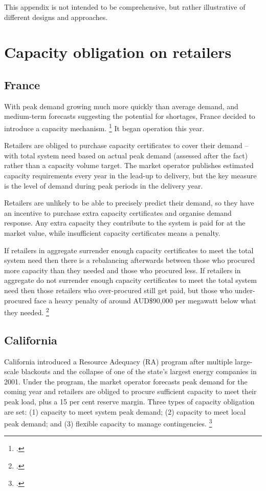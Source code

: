 \documentclass[FrontPage]{grattan}
\begin{document}
This appendix is not intended to be comprehensive, but rather illustrative of different designs and approaches.

\section{Capacity obligation on retailers}\label{sec:appendix-capacity-obligation-on-retailers}
\subsection{France}\label{subsec:appendix-france}
With peak demand growing much more quickly than average demand, and medium-term forecasts suggesting the potential for shortages, France decided to introduce a capacity mechanism.%
\footcite[][78]{CIGRE2016CapacityMechanisms}
It began operation this year.

Retailers are obliged to purchase capacity certificates to cover their demand -- with total system need based on actual peak demand (assessed after the fact) rather than a capacity volume target. The market operator publishes estimated capacity requirements every year in the lead-up to delivery, but the key measure is the level of demand during peak periods in the delivery year.

Retailers are unlikely to be able to precisely predict their demand, so they have an incentive to purchase extra capacity certificates and organise demand response. Any extra capacity they contribute to the system is paid for at the market value, while insufficient capacity certificates means a penalty.

If retailers in aggregate surrender enough capacity certificates to meet the total system need then there is a rebalancing afterwards between those who procured more capacity than they needed and those who procured less. If retailers in aggregate do not surrender enough capacity certificates to meet the total system need then those retailers who over-procured still get paid, but those who under-procured face a heavy penalty of around AUD\$90,000 per megawatt below what they needed.%
\footcite{RTE2014CapacityObligationReport}

\subsection{California}\label{subsec:appendix-california}
California introduced a Resource Adequacy (RA) program after multiple large-scale blackouts and the collapse of one of the state's largest energy companies in 2001. Under the program, the market operator forecasts peak demand for the coming year and retailers are obliged to procure sufficient capacity to meet their peak load, plus a 15 per cent reserve margin. Three types of capacity obligation are set: (1) capacity to meet system peak demand; (2) capacity to meet local peak demand; and (3) flexible capacity to manage contingencies.%
\footcite{CPUC2017ResourceAdequacy}
\end{document}
